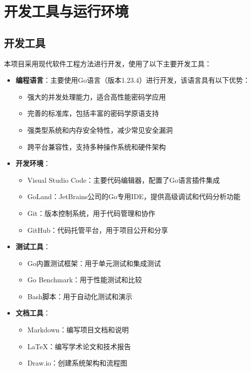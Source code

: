\section{开发工具与运行环境}

\subsection{开发工具}

本项目采用现代软件工程方法进行开发，使用了以下主要开发工具：

\begin{itemize}
    \item \textbf{编程语言}：主要使用Go语言（版本1.23.4）进行开发，该语言具有以下优势：
    \begin{itemize}
        \item 强大的并发处理能力，适合高性能密码学应用
        \item 完善的标准库，包括丰富的密码学原语支持
        \item 强类型系统和内存安全特性，减少常见安全漏洞
        \item 跨平台兼容性，支持多种操作系统和硬件架构
    \end{itemize}
    
    \item \textbf{开发环境}：
    \begin{itemize}
        \item Visual Studio Code：主要代码编辑器，配置了Go语言插件集成
        \item GoLand：JetBrains公司的Go专用IDE，提供高级调试和代码分析功能
        \item Git：版本控制系统，用于代码管理和协作
        \item GitHub：代码托管平台，用于项目公开和分享
    \end{itemize}
    
    \item \textbf{测试工具}：
    \begin{itemize}
        \item Go内置测试框架：用于单元测试和集成测试
        \item Go Benchmark：用于性能测试和比较
        \item Bash脚本：用于自动化测试和演示
    \end{itemize}
    
    \item \textbf{文档工具}：
    \begin{itemize}
        \item Markdown：编写项目文档和说明
        \item LaTeX：编写学术论文和技术报告
        \item Draw.io：创建系统架构和流程图
    \end{itemize}
\end{itemize}


